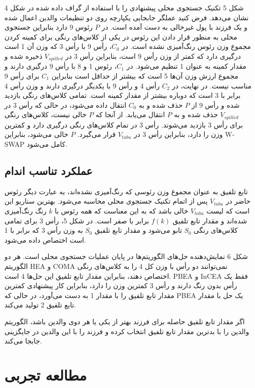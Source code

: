 \documentclass[a4paper,10pt]{article}
\begin{document}
            شکل 5 تکنیک جستجوی محلی پیشنهادی را با استفاده از گراف داده شده در شکل 4 نشان می‌دهد. فرض کنید عملگر جابجایی یکپارچه روی دو تنظیمات والدین اعمال شده و یک فرزند با پول غیرخالی به دست آمده است. در $P$ رئوس 9 دارد بنابراین جستجوی محلی به منظور قرار دادن این رئوس در یکی از کلاس‌های رنگی برای کمینه کردن مجموع وزن رئوس رنگ‌آمیزی نشده است. در $C_0$، رأس 9 با رأس 3 که وزن آن 1 است درگیری دارد که کمتر از وزن رأس 9 است، بنابراین رأس 3 در $V_{spilled}$ ذخیره شده و مقدار کمینه به عنوان 1 تنظیم می‌شود. در $C_1$، رئوس 1 و 8 با رأس 9 درگیری دارند و مجموع ارزش وزن آن‌ها 5 است که بیشتر از حداقل است بنابراین $C_1$ برای رأس 9 مناسب نیست. در نهایت، در $C_2$ رأس 4 و رأس 9 با یکدیگر درگیری دارند و وزن رأس 4 برابر با 3 است که دوباره بیشتر از مقدار کمینه است. تمامی کلاس‌های رنگی بازدید شده و رأس 9 از $P$ حذف شده و به $C_0$ انتقال داده می‌شود، در حالی که رأس 3 در $V_{spilled}$ حذف شده و به $P$ انتقال می‌یابد. از آنجا که $P$ خالی نیست، کلاس‌های رنگی برای رأس 3 بازدید می‌شوند. رأس 3 در تمام کلاس‌های رنگی درگیری دارد و کمترین وزن را دارد، بنابراین رأس 3 در $V_{tabu}$ قرار می‌گیرد. $P$ خالی می‌شود، بنابراین W-SWAP کامل می‌شود.

        \subsection{عملکرد تناسب اندام}

            تابع تلفیق به عنوان مجموع وزن رئوسی که رنگ‌آمیزی نشده‌اند، به عبارت دیگر رئوس حاضر در $V_{tabu}$ پس از اتمام تکنیک جستجوی محلی محاسبه می‌شود. بهترین سناریو این است که لیست $V_{tabu}$ خالی باشد که به این معناست که همه رئوس با $k$ رنگ رنگ‌آمیزی شده‌اند و مقدار تابع تلفیق $f(k)$ برابر با صفر است. در شکل 5، رأس 3 برای تمامی کلاس‌های رنگی $S_0$ تابو می‌شود و مقدار تابع تلفیق $S_0$ به وزن رأس 3 که برابر با 1 است اختصاص داده می‌شود.

            شکل 6 نمایش‌دهنده حل‌های الگوریتم‌ها در پایان عملیات جستجوی محلی است. هر دو الگوریتم HEA و COMA نمی‌توانند دو رأس با وزن کل 4 را به کلاس‌های رنگی اختصاص دهند، بنابراین مقدار تابع تلفیق این حل‌ها 4 است. PBEA و InCEA فقط یک رأس بدون رنگ دارند و رأس 3 کمترین وزن را دارد، بنابراین کار پیشنهادی کمترین مقدار تابع تلفیق را با مقدار 1 به دست می‌آورد، در حالی که PBEA یک حل با مقدار تابع تلفیق 2 تولید می‌کند.

            اگر مقدار تابع تلفیق حاصله برای فرزند بهتر از یکی یا هر دوی والدین باشد، الگوریتم والدین را با بدترین مقدار تابع تلفیق انتخاب کرده و فرزند را با این والدین در جایگزینی جابجا می‌کند.

    \section{مطالعه تجربی}
            
\end{document}
